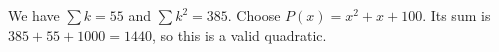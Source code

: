 We have $\sum k=55$ and $\sum k^2=385$. Choose $P(x)=x^2+x+100$. Its sum is $385+55+1000=1440$, so this is a valid quadratic.
